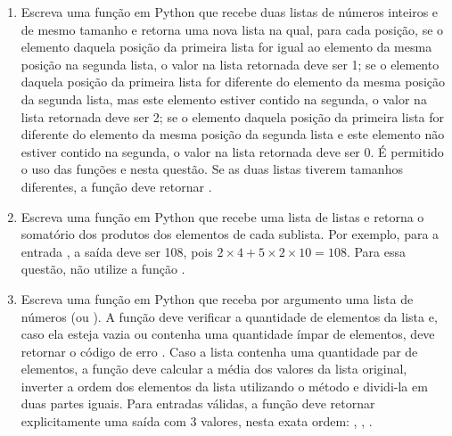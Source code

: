 \begin{enumerate}[label=\textbf{Q\arabic*.}]
    \vspace{0.5cm}
    \item Escreva uma função em Python que recebe duas listas de números inteiros e de mesmo tamanho e retorna uma nova lista na qual, para cada posição, se o elemento daquela posição da primeira lista for igual ao elemento da mesma posição na segunda lista, o valor na lista retornada deve ser 1; se o elemento daquela posição da primeira lista for diferente do elemento da mesma posição da segunda lista, mas este elemento estiver contido na segunda, o valor na lista retornada deve ser 2; se o elemento daquela posição da primeira lista for diferente do elemento da mesma posição da segunda lista e este elemento não estiver contido na segunda, o valor na lista retornada deve ser 0. É permitido o uso das funções  e  nesta questão. Se as duas listas tiverem tamanhos diferentes, a função deve retornar .

    \vspace{0.5cm}
    \item Escreva uma função em Python que recebe uma lista de listas e retorna o somatório dos produtos dos elementos de cada sublista. Por exemplo, para a entrada \code{([[2,4],[5,2,10]])}, a saída deve ser 108, pois $2 \times 4 + 5 \times 2 \times 10 = 108$. Para essa questão, não utilize a função .


    \item Escreva uma função em Python que receba por argumento uma lista de números (ou ). A função deve verificar a quantidade de elementos da lista e, caso ela esteja vazia ou contenha uma quantidade ímpar de elementos, deve retornar o código de erro . Caso a lista contenha uma quantidade par de elementos, a função deve calcular a média dos valores da lista original, inverter a ordem dos elementos da lista utilizando o método  e dividi-la em duas partes iguais. Para entradas válidas, a função deve retornar explicitamente uma saída com 3 valores, nesta exata ordem: , , .



\end{enumerate}
